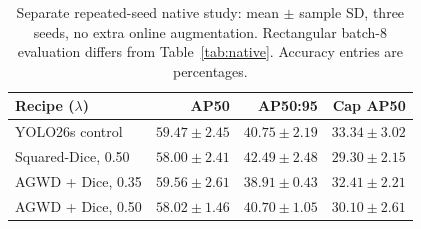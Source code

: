\begin{table}[!t]\centering
\caption{Separate repeated-seed native study: mean $\pm$ sample SD, three seeds, no extra online augmentation. Rectangular batch-8 evaluation differs from Table~\ref{tab:native}. Accuracy entries are percentages.}
\label{tab:controlled}\footnotesize\setlength{\tabcolsep}{3pt}
\begin{tabular}{lrrr}\toprule
Recipe ($\lambda$) & AP50 & AP50:95 & Cap AP50\\\midrule
YOLO26s control & $59.47\pm2.45$ & $40.75\pm2.19$ & $33.34\pm3.02$ \\
Squared-Dice, 0.50 & $58.00\pm2.41$ & $42.49\pm2.48$ & $29.30\pm2.15$ \\
AGWD + Dice, 0.35 & $59.56\pm2.61$ & $38.91\pm0.43$ & $32.41\pm2.21$ \\
AGWD + Dice, 0.50 & $58.02\pm1.46$ & $40.70\pm1.05$ & $30.10\pm2.61$ \\
\bottomrule\end{tabular}\end{table}

